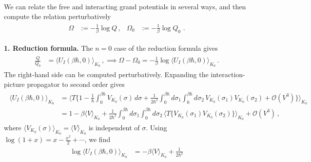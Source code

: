 \documentclass[../QFT_main.tex]{subfiles}
\begin{document}
\begin{mytheorem}
%
We can relate the free and interacting grand potentials in several ways, and then compute the relation perturbatively 
{\small\begin{align}\begin{aligned}
    \Omega&:=-\tfrac{1}{\beta}\log Q\,,
    &
    \Omega_0&:=-\tfrac{1}{\beta}\log Q_0\,\,.
\end{aligned}\end{align}}

\noindent
\textbf{1. Reduction formula.}
The $n=0$ case of the reduction formula gives
{\small\begin{align}\begin{aligned}
    \tfrac{Q}{Q_0}
    &=
    \big\langle U_I(\beta\hbar,0)\big\rangle_{K_0}\,,
    \implies 
    \Omega-\Omega_0= -\tfrac{1}{\beta}
    \log\big\langle U_I(\beta\hbar,0)\big\rangle_{K_0}\,.
\end{aligned}\end{align}}
The right-hand side can be computed perturbatively.
Expanding the interaction-picture propagator to second order gives
{\small\begin{align}\begin{aligned}
    \big\langle U_I(\beta\hbar,0)\big\rangle_{K_0}
    &=
    \Big\langle
        T\Big\{
            1
            -\tfrac{1}{\hbar}\int_0^{\beta\hbar}
                V_{K_0}(\sigma)\,d\sigma
            +\tfrac{1}{2\hbar^2}
                \int_0^{\beta\hbar}d\sigma_1
                \int_0^{\beta\hbar}d\sigma_2\,
                V_{K_0}(\sigma_1)V_{K_0}(\sigma_2)
            +\mathcal O(V^3)
        \Big\}
    \Big\rangle_{K_0}
    \\
    &=
    1-\beta\langle V\rangle_{K_0}
    +\tfrac{1}{2\hbar^2}
        \int_0^{\beta\hbar}d\sigma_1
        \int_0^{\beta\hbar}d\sigma_2\,
        \Big\langle
            T\big\{
                V_{K_0}(\sigma_1)V_{K_0}(\sigma_2)
            \big\}
        \Big\rangle_{K_0}
    +\mathcal O(V^3)\,,
\end{aligned}\end{align}}
where $\langle V_{K_0}(\sigma)\rangle_{K_0}=\langle V\rangle_{K_0}$ is independent of $\sigma$.
Using $\log(1+x)=x-\tfrac{x^2}{2}+\cdots$, we find
{\small\begin{align}\begin{aligned}
    \log\big\langle U_I(\beta\hbar,0)\big\rangle_{K_0}
    &=
    -\beta\langle V\rangle_{K_0}
    +\tfrac{1}{2\hbar^2}

\end{aligned}
\end{align}}
\end{mytheorem}
\end{document}
